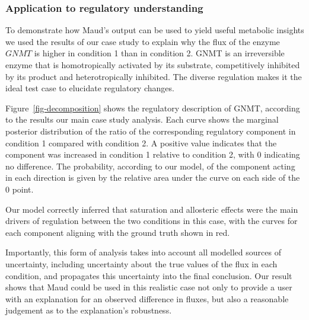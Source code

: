 \documentclass[journal=,manuscript=]{achemso}
\begin{document}
\hypertarget{application-to-regulatory-understanding}{%
\subsubsection{Application to regulatory
understanding}\label{application-to-regulatory-understanding}}

To demonstrate how Maud's output can be used to yield useful metabolic
insights we used the results of our case study to explain why the flux
of the enzyme \(GNMT\) is higher in condition 1 than in condition 2.
GNMT is an irreversible enzyme that is homotropically activated by its
substrate, competitively inhibited by its product and heterotropically
inhibited. The diverse regulation makes it the ideal test case to
elucidate regulatory changes.

Figure~\ref{fig-decomposition} shows the regulatory description of GNMT,
according to the results our main case study analysis. Each curve shows
the marginal posterior distribution of the ratio of the corresponding
regulatory component in condition 1 compared with condition 2. A
positive value indicates that the component was increased in condition 1
relative to condition 2, with 0 indicating no difference. The
probability, according to our model, of the component acting in each
direction is given by the relative area under the curve on each side of
the 0 point.

Our model correctly inferred that saturation and allosteric effects were
the main drivers of regulation between the two conditions in this case,
with the curves for each component aligning with the ground truth shown
in red.

Importantly, this form of analysis takes into account all modelled
sources of uncertainty, including uncertainty about the true values of
the flux in each condition, and propagates this uncertainty into the
final conclusion. Our result shows that Maud could be used in this
realistic case not only to provide a user with an explanation for an
observed difference in fluxes, but also a reasonable judgement as to the
explanation's robustness.
\end{document}
